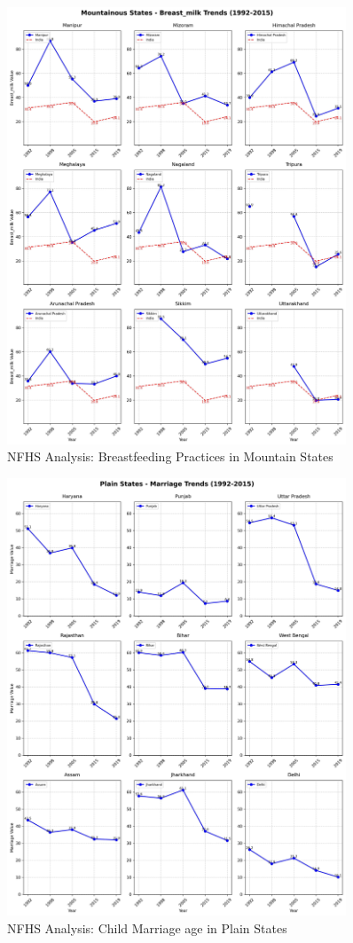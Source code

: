 \begin{figure}[H]
    \centering
    \includegraphics[width=0.9\textwidth]{figures/nfhs/mountainous_states_breast_milk_subplots.pdf}
    \caption{NFHS Analysis: Breastfeeding Practices in Mountain States}
    \label{fig:nfhs_mountain_breast_milk}
\end{figure}

\begin{figure}[H]
    \centering
    \includegraphics[width=0.9\textwidth]{figures/nfhs/plain_states_marriage_subplots.pdf}
    \caption{NFHS Analysis: Child Marriage age in Plain States}
    \label{fig:nfhs_plain_marriage}
\end{figure}